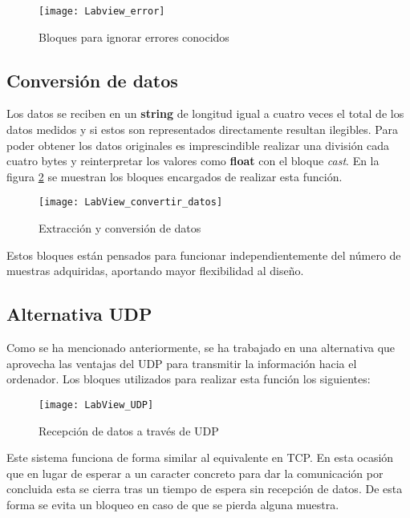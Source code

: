 \begin{figure} [h]
    \centering
    \texttt{[image: Labview\_error]}
    \caption{Bloques para ignorar errores conocidos}
    \label{fig:Labview_error}
\end{figure}

\subsection{Conversión de datos\label{sec:Software_Labview_ConvDatos}}

Los datos se reciben en un \textbf{string} de longitud igual a cuatro veces el total de los datos medidos y si estos son representados directamente resultan ilegibles. Para poder obtener los datos originales es imprescindible realizar una división cada cuatro bytes y reinterpretar los valores como \textbf{float} con el bloque \textit{cast}. En la figura \ref{fig:LabView_convertir_datos} se muestran los bloques encargados de realizar esta función.

\begin{figure} [h]
    \centering
    \texttt{[image: LabView\_convertir\_datos]}
    \caption{Extracción y conversión de datos}
    \label{fig:LabView_convertir_datos}
\end{figure}

Estos bloques están pensados para funcionar independientemente del número de muestras adquiridas, aportando mayor flexibilidad al diseño.

\subsection{Alternativa UDP\label{sec:Software_Labview_AltUDP}}

Como se ha mencionado anteriormente, se ha trabajado en una alternativa que aprovecha las ventajas del UDP para transmitir la información hacia el ordenador. Los bloques utilizados para realizar esta función los siguientes:

\begin{figure} [h]
    \centering
    \texttt{[image: LabView\_UDP]}
    \caption{Recepción de datos a través de UDP}
    \label{fig:LabView_UDP}
\end{figure}

Este sistema funciona de forma similar al equivalente en TCP. En esta ocasión que en lugar de esperar a un caracter concreto para dar la comunicación por concluida esta se cierra tras un tiempo de espera sin recepción de datos. De esta forma se evita un bloqueo en caso de que se pierda alguna muestra.